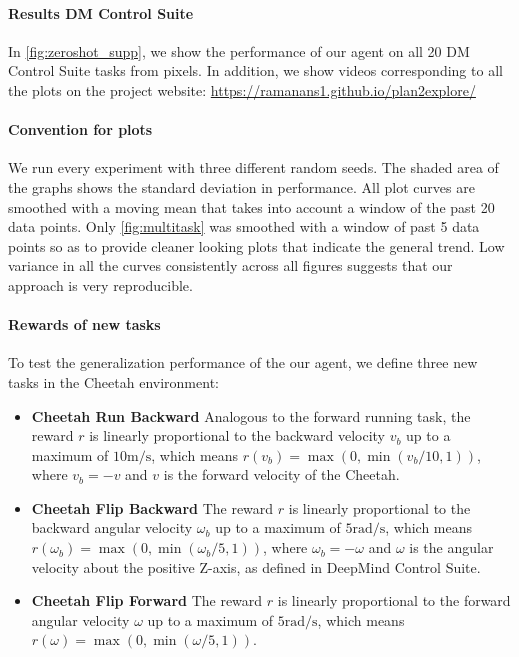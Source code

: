 \documentclass{article}
\begin{document}
\paragraph{Results DM Control Suite}
In \cref{fig:zeroshot_supp}, we show the performance of our agent on all 20 DM Control Suite tasks from pixels. In addition, we show videos corresponding to all the plots on the project website: \url{https://ramanans1.github.io/plan2explore/}

\paragraph{Convention for plots}
We run every experiment with three different random seeds. The shaded area of the graphs shows the standard deviation in performance. All plot curves are smoothed with a moving mean that takes into account a window of the past 20 data points. Only \cref{fig:multitask} was smoothed with a window of past 5 data points so as to provide cleaner looking plots that indicate the general trend. Low variance in all the curves consistently across all figures suggests that our approach is very reproducible.

\paragraph{Rewards of new tasks}
To test the generalization performance of the our agent, we define three new tasks in the Cheetah environment:
\vspace*{-1ex}
\begin{itemize}
\item\textbf{Cheetah Run Backward}\quad
Analogous to the forward running task, the reward $r$ is linearly proportional to the backward velocity $v_b$ up to a maximum of $10 \mathrm{m/s}$, which means $r(v_b) = \max(0,\min(v_b/10,1))$, where $v_b=-v$ and $v$ is the forward velocity of the Cheetah.
\item\textbf{Cheetah Flip Backward}\quad
The reward $r$ is linearly proportional to the backward angular velocity $\omega_b$ up to a maximum of $5 \mathrm{rad/s}$, which means $r(\omega_b) = \max(0,\min(\omega_b/5,1))$, where $\omega_b = -\omega$ and $\omega$ is the angular velocity about the positive Z-axis, as defined in DeepMind Control Suite.
\item\textbf{Cheetah Flip Forward}\quad
The reward $r$ is linearly proportional to the forward angular velocity $\omega$ up to a maximum of $5 \mathrm{rad/s}$, which means $r(\omega) = \max(0,\min(\omega/5,1))$.
\end{itemize}
\end{document}
